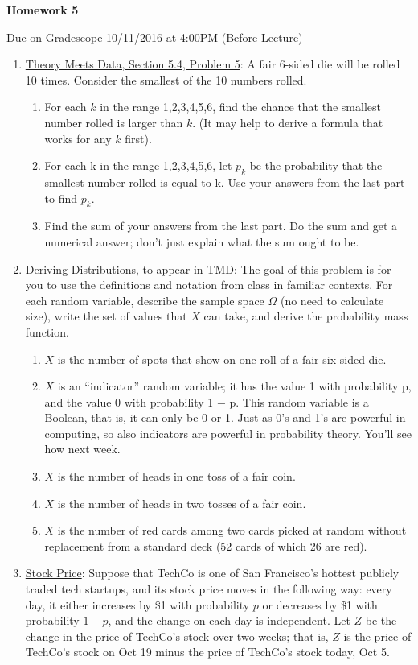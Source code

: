 \documentclass[11pt]{article}
\begin{document}
\centerline{\textbf{Homework 5}}
\centerline{Due on Gradescope 10/11/2016 at 4:00PM (Before Lecture)}

\begin{enumerate}
\item \underline{Theory Meets Data, Section 5.4, Problem 5}: 
A fair 6-sided die will be rolled 10 times. Consider the smallest of the 10 numbers rolled.
\begin{enumerate}
    \item For each $k$ in the range 1,2,3,4,5,6, find the chance that the smallest number rolled is
larger than $k$. (It may help to derive a formula that works for any $k$ first).
    \item For each k in the range 1,2,3,4,5,6, let $p_k$ be the probability that the smallest number rolled is equal to k. Use your answers from the last part to find $p_k$.
    \item Find the sum of your answers from the last part. Do the sum and get a numerical answer; don’t just explain what the sum ought to be. 
\end{enumerate}

\item \underline{Deriving Distributions, to appear in TMD}:
The goal of this problem is for you to use the definitions and notation from class in familiar
contexts. For each random variable, describe the sample space $\Omega$ (no need to calculate size), write the set of values that $X$ can take, and derive the probability mass function. 
\begin{enumerate}
\item $X$ is the number of spots that show on one roll of a fair six-sided die.
\item $X$ is an “indicator” random variable; it has the value 1 with probability p, and the value 0
with probability 1 − p. This random variable is a Boolean, that is, it can only be 0 or 1. Just as
0’s and 1’s are powerful in computing, so also indicators are powerful in probability theory. You’ll see how next week.
\item $X$ is the number of heads in one toss of a fair coin.
\item $X$ is the number of heads in two tosses of a fair coin.
\item $X$ is the number of red cards among two cards picked at random without replacement from
a standard deck (52 cards of which 26 are red).
\end{enumerate}

\item \underline{Stock Price}:
Suppose that TechCo is one of San Francisco's hottest publicly traded tech startups, and its stock price moves in the following way: every day, it either increases by \$1 with probability $p$ or decreases by \$1 with probability $1-p$, and the change on each day is independent. Let $Z$ be the change in the price of TechCo's stock over two weeks; that is, $Z$ is the price of TechCo's stock on Oct 19 minus the price of TechCo's stock today, Oct 5.


\end{enumerate}
\end{document}
